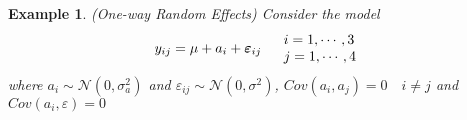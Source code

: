 \documentclass{article}
\newtheorem{example}[theorem]{Example}
\begin{document}
\bigskip

\begin{example}
(One-way Random Effects) Consider the model%
\begin{equation*}
y_{ij}=\mu +a_{i}+\mathbf{\varepsilon }_{ij}\quad 
\begin{tabular}{l}
$i=1,\cdots ,3$ \\ 
$j=1,\cdots ,4$%
\end{tabular}%
\end{equation*}%
where $a_{i}\sim \mathcal{N}\left( 0,\sigma _{a}^{2}\right) $ and $%
\varepsilon _{ij}\sim \mathcal{N}\left( 0,\sigma ^{2}\right) $, $Cov\left(
a_{i},a_{j}\right) =0\quad i\neq j$ and $Cov\left( a_{i},\varepsilon \right)
=0$
\end{example}
\end{document}
